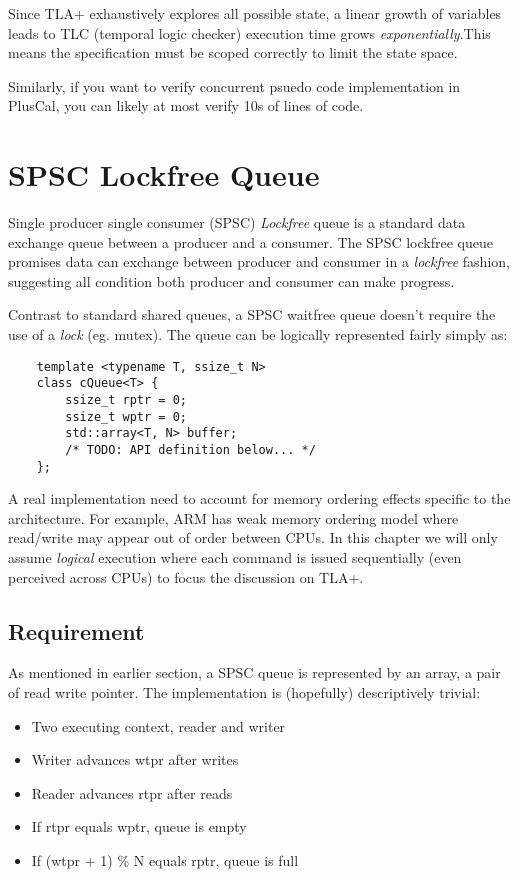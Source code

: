 \documentclass{report}
\begin{document}
Since TLA+ exhaustively explores all possible state, a linear growth of
variables leads to TLC (temporal logic checker) execution time grows
\textit{exponentially}.This means the specification must be scoped correctly to
limit the state space.\newline

Similarly, if you want to verify concurrent psuedo code implementation in
PlusCal, you can likely at most verify 10s of lines of code.

\chapter{SPSC Lockfree Queue}

Single producer single consumer (SPSC) \textit{Lockfree} queue is a standard
data exchange queue between a producer and a consumer. The SPSC lockfree queue
promises data can exchange between producer and consumer in a \textit{lockfree}
fashion, suggesting all condition both producer and consumer can make
progress.\newline

Contrast to standard shared queues, a SPSC waitfree queue doesn't require the
use of a \textit{lock} (eg. mutex). The queue can be logically represented
fairly simply as:

\begin{lstlisting}
    template <typename T, ssize_t N>
    class cQueue<T> { 
        ssize_t rptr = 0; 
        ssize_t wptr = 0; 
        std::array<T, N> buffer;
        /* TODO: API definition below... */
    };
\end{lstlisting}

A real implementation need to account for memory ordering effects specific to
the architecture. For example, ARM has weak memory ordering model where
read/write may appear out of order between CPUs. In this chapter we will only
assume \textit{logical} execution where each command is issued sequentially
(even perceived across CPUs) to focus the discussion on TLA+.
\section{Requirement}

As mentioned in earlier section, a SPSC queue is represented by an array, a pair
of read write pointer. The implementation is (hopefully) descriptively trivial:

\begin{itemize}
    \item Two executing context, reader and writer
    \item Writer advances wtpr after writes
    \item Reader advances rtpr after reads
    \item If rtpr equals wptr, queue is empty
    \item If (wtpr + 1) \% N equals rptr, queue is full
\end{itemize}
\end{document}
